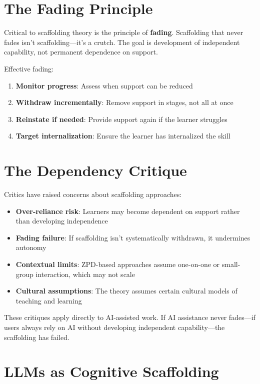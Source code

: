 \section{The Fading Principle}

Critical to scaffolding theory is the principle of \textbf{fading}. Scaffolding that never fades isn't scaffolding---it's a crutch. The goal is development of independent capability, not permanent dependence on support.

Effective fading:

\begin{enumerate}
    \item \textbf{Monitor progress}: Assess when support can be reduced
    \item \textbf{Withdraw incrementally}: Remove support in stages, not all at once
    \item \textbf{Reinstate if needed}: Provide support again if the learner struggles
    \item \textbf{Target internalization}: Ensure the learner has internalized the skill
\end{enumerate}

\section{The Dependency Critique}

Critics have raised concerns about scaffolding approaches:

\begin{itemize}
    \item \textbf{Over-reliance risk}: Learners may become dependent on support rather than developing independence
    \item \textbf{Fading failure}: If scaffolding isn't systematically withdrawn, it undermines autonomy
    \item \textbf{Contextual limits}: ZPD-based approaches assume one-on-one or small-group interaction, which may not scale
    \item \textbf{Cultural assumptions}: The theory assumes certain cultural models of teaching and learning
\end{itemize}

These critiques apply directly to AI-assisted work. If AI assistance never fades---if users always rely on AI without developing independent capability---the scaffolding has failed.

\section{LLMs as Cognitive Scaffolding}

